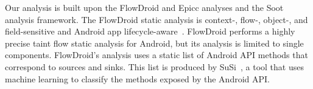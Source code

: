 %
Our analysis is built upon the FlowDroid and Epicc analyses and the
Soot analysis framework. 
%
The FlowDroid static analysis is context-, flow-, object-, and
field-sensitive and Android app lifecycle-aware~\cite{FlowDroid-PLDI-2014}. 
FlowDroid performs a highly precise taint flow static analysis for Android, but its analysis is limited to single components.
FlowDroid's analysis uses a static list of Android API methods that correspond to sources and sinks.
This list is produced by SuSi~\cite{rab14classifying}, a tool that uses machine learning to classify the methods exposed by the Android API.


